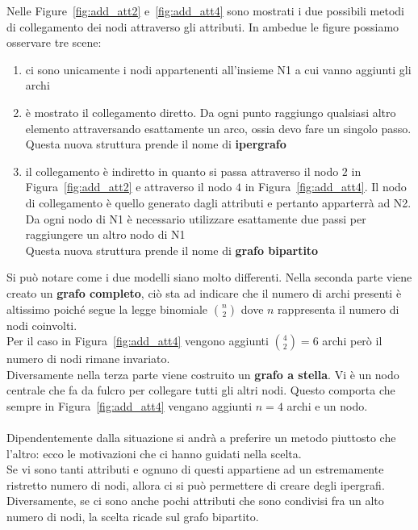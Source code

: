 %
Nelle Figure~\ref{fig:add_att2} e~\ref{fig:add_att4} sono mostrati i due possibili metodi di collegamento dei nodi attraverso gli attributi. In ambedue le figure possiamo osservare tre scene:
\begin{enumerate}
	\item ci sono unicamente i nodi appartenenti all'insieme N1 a cui vanno aggiunti gli archi
	\item è mostrato il collegamento diretto. Da ogni punto raggiungo qualsiasi altro elemento attraversando esattamente un arco, ossia devo fare un singolo passo.\\
	Questa nuova struttura prende il nome di \textbf{ipergrafo}
	\item il collegamento è indiretto in quanto si passa attraverso il nodo $2$ in Figura~\ref{fig:add_att2} e attraverso il nodo $4$ in Figura~\ref{fig:add_att4}. Il nodo di collegamento è quello generato dagli attributi e pertanto apparterrà ad N2.\\
	Da ogni nodo di N1 è necessario utilizzare esattamente due passi per raggiungere un altro nodo di N1\\
	Questa nuova struttura prende il nome di \textbf{grafo bipartito}
\end{enumerate}
%
Si può notare come i due modelli siano molto differenti. Nella seconda parte viene creato un \textbf{grafo completo}, ciò sta ad indicare che il numero di archi presenti è altissimo poiché segue la legge binomiale $ \binom{n}{2}$ dove $n$ rappresenta il numero di nodi coinvolti.\\
Per il caso in Figura~\ref{fig:add_att4} vengono aggiunti $ \binom{4}{2} = 6$ archi però il numero di nodi rimane invariato.\\
Diversamente nella terza parte viene costruito un \textbf{grafo a stella}. Vi è un nodo centrale che fa da fulcro per collegare tutti gli altri nodi. Questo comporta che sempre in Figura~\ref{fig:add_att4} vengano aggiunti $n=4$ archi e un nodo.\\
\\
Dipendentemente dalla situazione si andrà a preferire un metodo piuttosto che l'altro: ecco le motivazioni che ci hanno guidati nella scelta.\\
Se vi sono tanti attributi e ognuno di questi appartiene ad un estremamente ristretto numero di nodi, allora ci si può permettere di creare degli ipergrafi. Diversamente, se ci sono anche pochi attributi che sono condivisi fra un alto numero di nodi, la scelta ricade sul grafo bipartito.\\

